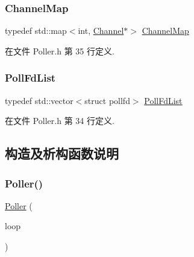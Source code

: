 \subsubsection{\texorpdfstring{Channel\+Map}{ChannelMap}}
{\footnotesize\ttfamily typedef std\+::map$<$int, \hyperlink{classmuduo_1_1Channel}{Channel}$\ast$$>$ \hyperlink{classmuduo_1_1Poller_a950db725d18ce33d8457ae784380a07e}{Channel\+Map}\hspace{0.3cm}{\ttfamily [private]}}



在文件 Poller.\+h 第 35 行定义.

\mbox{\label{classmuduo_1_1Poller_a0cf1be2f572740022edada139cacfb12}} 
\subsubsection{\texorpdfstring{Poll\+Fd\+List}{PollFdList}}
{\footnotesize\ttfamily typedef std\+::vector$<$struct pollfd$>$ \hyperlink{classmuduo_1_1Poller_a0cf1be2f572740022edada139cacfb12}{Poll\+Fd\+List}\hspace{0.3cm}{\ttfamily [private]}}



在文件 Poller.\+h 第 34 行定义.



\subsection{构造及析构函数说明}
\mbox{\label{classmuduo_1_1Poller_ad1445448c7a54f569eb9d6c6163ca7bc}} 
\subsubsection{\texorpdfstring{Poller()}{Poller()}}
{\footnotesize\ttfamily \hyperlink{classmuduo_1_1Poller}{Poller} (\begin{DoxyParamCaption}\item[{\hyperlink{classmuduo_1_1EventLoop}{Event\+Loop} $\ast$}]{loop }\end{DoxyParamCaption})}



